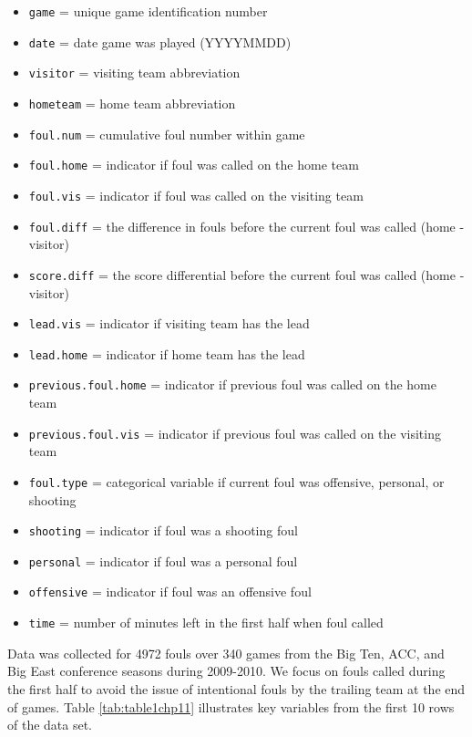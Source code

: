 \documentclass[
]{krantz}
\providecommand{\tightlist}{%
  \setlength{\itemsep}{0pt}\setlength{\parskip}{0pt}}
\begin{document}
\begin{itemize}
\tightlist
\item
  \texttt{game} = unique game identification number
\item
  \texttt{date} = date game was played (YYYYMMDD)
\item
  \texttt{visitor} = visiting team abbreviation
\item
  \texttt{hometeam} = home team abbreviation
\item
  \texttt{foul.num} = cumulative foul number within game
\item
  \texttt{foul.home} = indicator if foul was called on the home team
\item
  \texttt{foul.vis} = indicator if foul was called on the visiting team
\item
  \texttt{foul.diff} = the difference in fouls before the current foul was called (home - visitor)
\item
  \texttt{score.diff} = the score differential before the current foul was called (home - visitor)
\item
  \texttt{lead.vis} = indicator if visiting team has the lead
\item
  \texttt{lead.home} = indicator if home team has the lead
\item
  \texttt{previous.foul.home} = indicator if previous foul was called on the home team
\item
  \texttt{previous.foul.vis} = indicator if previous foul was called on the visiting team
\item
  \texttt{foul.type} = categorical variable if current foul was offensive, personal, or shooting
\item
  \texttt{shooting} = indicator if foul was a shooting foul
\item
  \texttt{personal} = indicator if foul was a personal foul
\item
  \texttt{offensive} = indicator if foul was an offensive foul
\item
  \texttt{time} = number of minutes left in the first half when foul called
\end{itemize}

Data was collected for 4972 fouls over 340 games from the Big Ten, ACC, and Big East conference seasons during 2009-2010. We focus on fouls called during the first half to avoid the issue of intentional fouls by the trailing team at the end of games. Table \ref{tab:table1chp11} illustrates key variables from the first 10 rows of the data set.
\end{document}
